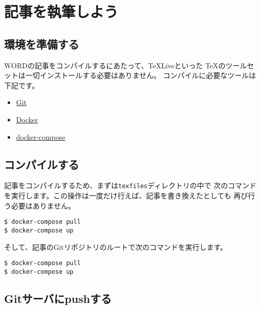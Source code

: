 \documentclass[../../main]{subfiles}
\begin{document}
\renewcommand{\thelstlisting}{\arabic{lstlisting}}

\subtitle{ヘッダの見出し}


\author{情報 太郎}

\chapter{記事を執筆しよう}

\section{環境を準備する}

WORDの記事をコンパイルするにあたって、\TeX Liveといった
\TeX のツールセットは一切インストールする必要はありません。
コンパイルに必要なツールは下記です。

\begin{itemize}
  \item \href{https://git-scm.com}{Git}
  \item \href{https://www.docker.com/}{Docker}
  \item \href{https://github.com/docker/compose}{docker-compose}
\end{itemize}

\section{コンパイルする}

記事をコンパイルするため、まずは\lstinline|texfiles|ディレクトリの中で
次のコマンドを実行します。この操作は一度だけ行えば、記事を書き換えたとしても
再び行う必要はありません。

\begin{lstlisting}
$ docker-compose pull
$ docker-compose up
\end{lstlisting}

そして、記事のGitリポジトリのルートで次のコマンドを実行します。

\begin{lstlisting}
$ docker-compose pull
$ docker-compose up  
\end{lstlisting}

\section{Gitサーバにpushする}
\end{document}
